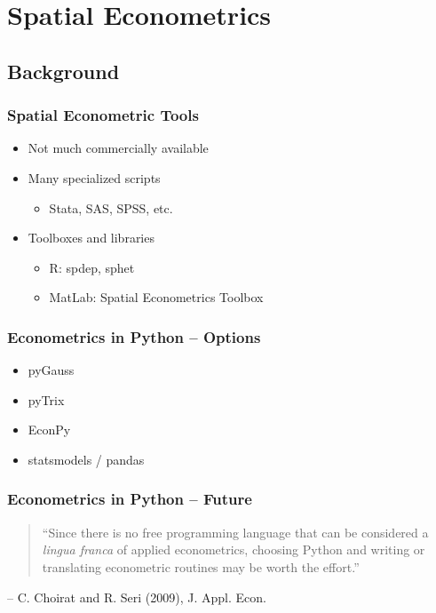 \section{Spatial Econometrics} 

\subsection{Background} 

\begin{frame}
	\frametitle{Spatial Econometric Tools}
 \begin{itemize}
 \item Not much commercially available
 \item Many specialized scripts
 \begin{itemize}
 \item Stata, SAS, SPSS, etc.
 \end{itemize}
 \item Toolboxes and libraries
 \begin{itemize}
 \item R: spdep, sphet
 \item MatLab: Spatial Econometrics Toolbox
 \end{itemize}
 \end{itemize}
 \end{frame} 

\begin{frame}
	\frametitle{Econometrics in Python -- Options}
 \begin{itemize}
 \item pyGauss
 \item pyTrix
 \item EconPy
 \item statsmodels / pandas
 \end{itemize}
 \end{frame} 

\begin{frame}
	\frametitle{Econometrics in Python -- Future}
  \begin{quote}
  ``Since there is no free programming language that can be
  considered a \emph{lingua franca} of applied econometrics, choosing
  Python and writing or translating econometric routines may be
  worth the effort.''
  \end{quote}
  \qquad\qquad\qquad\qquad -- C. Choirat and R. Seri (2009), J. Appl. Econ.
 \end{frame} 

